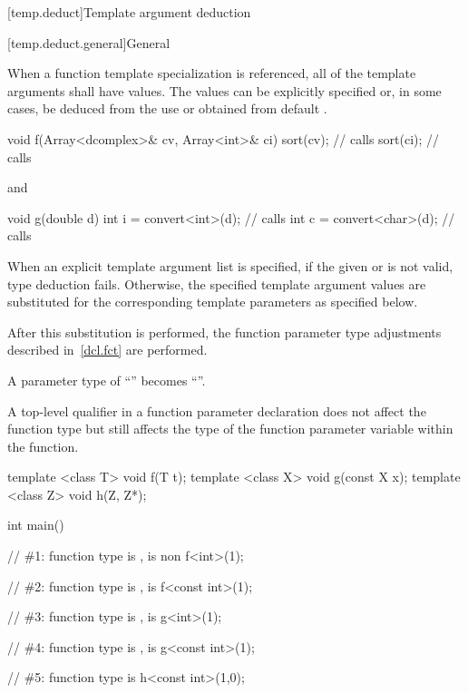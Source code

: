 [temp.deduct]{Template argument deduction}

[temp.deduct.general]{General}

\pnum
When a
function template
specialization is referenced, all of the
template arguments shall have values.
The values can be
explicitly specified or, in some cases, be deduced from the use
or obtained from default
.
\begin{example}
\begin{codeblock}
void f(Array<dcomplex>& cv, Array<int>& ci) {
  sort(cv);                     // calls 
  sort(ci);                     // calls 
}
\end{codeblock}
and
\begin{codeblock}
void g(double d) {
  int i = convert<int>(d);      // calls 
  int c = convert<char>(d);     // calls 
}
\end{codeblock}
\end{example}

\pnum
When an explicit template argument list is specified, if the
given  or
 is not valid,
type deduction fails.
Otherwise, the specified template argument values are substituted for the
corresponding template parameters as specified below.

\pnum
After this substitution is performed, the function parameter type
adjustments described in~\ref{dcl.fct} are performed.
\begin{example}
A parameter type of ``'' becomes
``''.
\end{example}
\begin{note}
A top-level qualifier in a function parameter declaration does not affect
the function type but still affects the type of the function parameter
variable within the function.
\end{note}
\begin{example}
\begin{codeblock}
template <class T> void f(T t);
template <class X> void g(const X x);
template <class Z> void h(Z, Z*);

int main() {
  // \#1: function type is ,  is non 
  f<int>(1);

  // \#2: function type is ,  is 
  f<const int>(1);

  // \#3: function type is ,  is 
  g<int>(1);

  // \#4: function type is ,  is 
  g<const int>(1);

  // \#5: function type is 
  h<const int>(1,0);
}
\end{codeblock}
\end{example}

